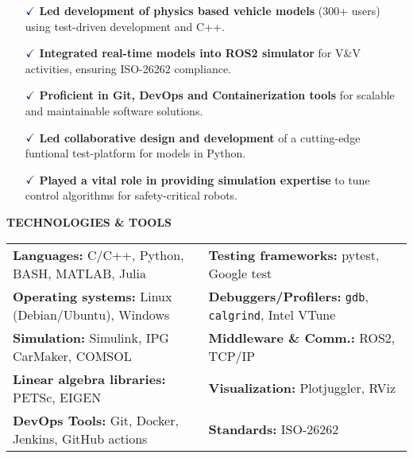 \documentclass[a4paper,10pt]{article}
\begin{document}
\vspace{0.1cm}
\begin{itemize}
    \item[$\textcolor{highlightcolor}{\checkmark}$] \textcolor{highlightcolor}{\textbf{Led development of physics based vehicle models}} (300+ users) using test-driven development and C++.
    \item[$\textcolor{highlightcolor}{\checkmark}$] \textcolor{highlightcolor}{\textbf{Integrated real-time models into ROS2 simulator}} for V\&V activities, ensuring ISO-26262 compliance.
    \item[$\textcolor{highlightcolor}{\checkmark}$] \textcolor{highlightcolor}{\textbf{Proficient in Git, DevOps and Containerization tools}} for scalable and maintainable software solutions.
    \item[$\textcolor{highlightcolor}{\checkmark}$] \textcolor{highlightcolor}{\textbf{Led collaborative design and development}} of a cutting-edge funtional test-platform for models in Python.
    \item[$\textcolor{highlightcolor}{\checkmark}$] \textcolor{highlightcolor}{\textbf{Played a vital role in providing simulation expertise}} to tune control algorithms for safety-critical robots.
\end{itemize}

\noindent{\rule{\linewidth}{1.4pt}}
\textbf{TECHNOLOGIES \& TOOLS}

\vspace{-0.1cm}
\noindent{\rule{\linewidth}{0.01cm}}

\vspace{-0.4cm}
\noindent
\begin{center}
    \begin{tabular}{ @{\hskip 0pt}m{} m{} }
        \textcolor{highlightcolor}{\textbf{Languages:}} C/C++, Python, BASH, MATLAB, Julia & \textcolor{highlightcolor}{\textbf{Testing frameworks:}} pytest, Google test \\ 
        \textcolor{highlightcolor}{\textbf{Operating systems:}} Linux (Debian/Ubuntu), Windows & \textcolor{highlightcolor}{\textbf{Debuggers/Profilers:}} \verb|gdb|, \verb|calgrind|, Intel VTune \\
        \textcolor{highlightcolor}{\textbf{Simulation:}} Simulink, IPG CarMaker, COMSOL & \textcolor{highlightcolor}{\textbf{Middleware \& Comm.:}} ROS2, TCP/IP \\
        \textcolor{highlightcolor}{\textbf{Linear algebra libraries:}} PETSc, EIGEN & \textcolor{highlightcolor}{\textbf{Visualization:}} Plotjuggler, RViz\\
        \textcolor{highlightcolor}{\textbf{DevOps Tools:}} Git, Docker, Jenkins, GitHub actions & \textcolor{highlightcolor}{\textbf{Standards:}} ISO-26262 \\
    \end{tabular}
\end{center}
\end{document}
